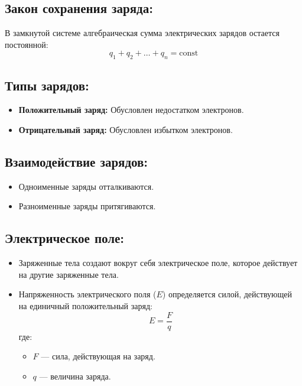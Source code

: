 \documentclass[a4paper,12pt]{article}
\begin{document}
\vspace{-9pt}
\subsection*{Закон сохранения заряда:}
\vspace{-3pt}
В замкнутой системе алгебраическая сумма электрических зарядов остается постоянной:
\vspace{-0.05em}
$$ q_1 + q_2 + \dots + q_n = \text{const} $$

\vspace{-18pt}
\subsection*{Типы зарядов:}
\vspace{-3pt}
\begin{itemize} [itemsep=0pt, topsep=0pt, parsep=0pt]
  \item \textbf{Положительный заряд:} Обусловлен недостатком электронов.
  \item \textbf{Отрицательный заряд:} Обусловлен избытком электронов.
\end{itemize}

\vspace{-18pt}
\subsection*{Взаимодействие зарядов:}
\vspace{-3pt}
\begin{itemize} [itemsep=0pt, topsep=0pt, parsep=0pt]
  \item Одноименные заряды отталкиваются.
  \item Разноименные заряды притягиваются.
\end{itemize}

\vspace{-18pt}
\subsection*{Электрическое поле:}
\vspace{-3pt}
\begin{itemize}
  \item Заряженные тела создают вокруг себя электрическое поле, которое действует на другие заряженные тела.
  \item Напряженность электрического поля ($E$) определяется силой, действующей на единичный положительный заряд:
  \vspace{-0.05em}
  $$ E = \frac{F}{q} $$
  где:
  \begin{itemize} [itemsep=0pt, topsep=0pt, parsep=0pt]
    \item $F$ — сила, действующая на заряд.
    \item $q$ — величина заряда.
  \end{itemize}
\end{itemize}
\end{document}
